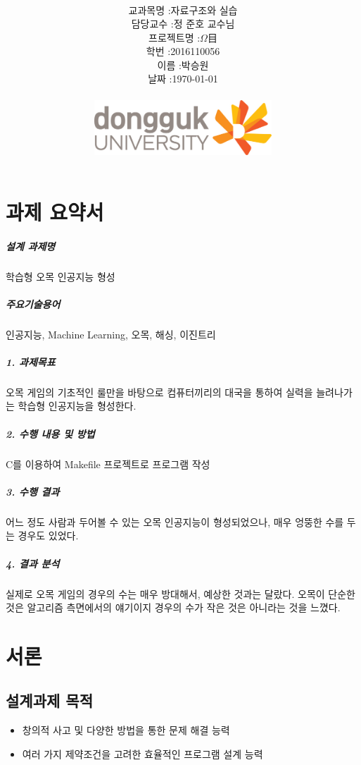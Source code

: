 \documentclass[12pt,a4paper]{report}
\title{
	\centering
	\pgfornament[width=12cm,color=teal]{84}\\
	\vspace{1cm}
	\fontsize{50}{50} \selectfont {오목 인공지능 형성\\설계과제 최종 보고서}\\
		\pgfornament[width=12cm,color=teal]{88}\\
	\vfill}
\author{
	\LARGE
	\begin{tabular}{rl}
		\hline
		교과목명 : & 자료구조와 실습\\
		담당교수 : & 정 준호 교수님\\
		프로젝트명 : & $ \Omega $目\\
		학번 : & 2016110056\\ 
		이름 : & 박승원\\
		날짜 : & \today\\
		\hline
	\end{tabular}\vspace{1cm}
	\\
\includegraphics[width=0.5\textwidth]{logo.jpg}
	}
\date{}
\begin{document}
\maketitle


\newpage
\tableofcontents
\newpage
\chapter*{과제 요약서}
\paragraph{설계 과제명} 학습형 오목 인공지능 형성\\ 
\paragraph{주요기술용어} 인공지능, Machine Learning, 오목, 해싱, 이진트리\\
\paragraph{1. 과제목표} 오목 게임의 기초적인 룰만을 바탕으로 컴퓨터끼리의 대국을 통하여 실력을 늘려나가는 학습형 인공지능을 형성한다.\\
\paragraph{2. 수행 내용 및 방법} C를 이용하여 Makefile 프로젝트로  프로그램 작성\\
\paragraph{3. 수행 결과} 어느 정도 사람과 두어볼 수 있는 오목 인공지능이 형성되었으나, 매우 엉뚱한 수를 두는 경우도 있었다. 
\paragraph{4. 결과 분석} 실제로 오목 게임의 경우의 수는 매우 방대해서, 예상한 것과는 달랐다. 오목이 단순한 것은 알고리즘 측면에서의 얘기이지 경우의 수가 작은 것은 아니라는 것을 느꼈다.\\

\noindent
\chapter{서론}
\section{설계과제 목적}
\begin{itemize}
\item 창의적 사고 및 다양한 방법을 통한 문제 해결 능력
\item 여러 가지 제약조건을 고려한 효율적인 프로그램 설계 능력
\end{itemize}
\end{document}
